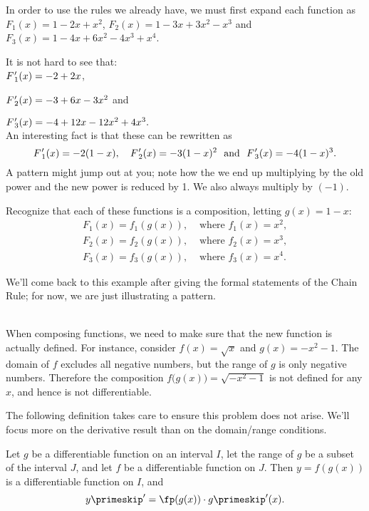 {In order to use the rules we already have, we must first expand each function as
$F_1(x) = 1 - 2x + x^2$,  $F_2(x) = 1 - 3x + 3x^2 - x^3$ and $F_3(x) = 1 - 4x + 6x^2 - 4x^3 + x^4$.
  
It is not hard to see that:\\

\noindent$F\hskip.5pt_1'(x) = -2 + 2x$,\vskip 3pt

\noindent$F\hskip.5pt_2'(x) = -3 + 6x - 3x^2$ and\vskip 3pt
  
\noindent$F\hskip.5pt_3'(x) = -4 + 12x - 12x^2 + 4x^3.$\\

An interesting fact is that these can be rewritten as
\[
F\hskip.5pt_1'(x) = -2(1-x),\quad  F\hskip.5pt_2'(x) = -3(1-x)^2\ \textrm{ and } \ 
F\hskip.5pt_3'(x) = -4(1-x)^3.
\]  
A pattern might jump out at you; note how the we end up multiplying by the old power and the new power is reduced by 1. We also always multiply by $(-1)$.

Recognize that each of these functions is a composition, letting $g(x) = 1-x$:
\begin{eqnarray*}
F_1(x) = f_1(g(x)),& \text{ where } f_1(x) = x^2,\\
F_2(x) = f_2(g(x)),& \text{ where } f_2(x) = x^3,\\
F_3(x) = f_3(g(x)),& \text{ where } f_3(x) = x^4.
\end{eqnarray*}

We'll come back to this example after giving the formal statements of the Chain Rule; for now, we are just illustrating a pattern.}\\

When composing functions, we need to make sure that the new function is actually defined. For instance, consider $f(x) = \sqrt{x}$ and $g(x) = -x^2-1$. The domain of $f$ excludes all negative numbers, but the range of $g$ is only negative numbers. Therefore the composition $f\big(g(x)\big) = \sqrt{-x^2-1}$ is not defined for any $x$, and hence is not differentiable.

The following definition takes care to ensure this problem does not arise. We'll focus more on the derivative result than on the domain/range conditions.

{%
Let $g$ be a differentiable function on an interval $I$, let the range of $g$ be a subset of the interval $J$, and let $f$ be a differentiable function on $J$.
\index{derivative!Chain Rule}\index{Chain Rule} Then $y=f(g(x))$ is a differentiable function on $I$, and 
\[
y\primeskip' = \fp(g(x))\cdot g\primeskip'(x).
\]%
}
  

